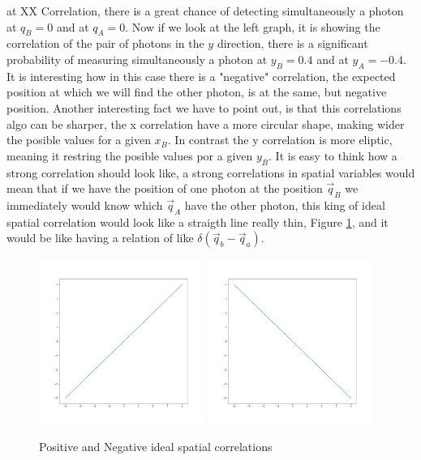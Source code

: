at XX Correlation, there is a great chance
of detecting simultaneously a photon at $q_B=0$ and at $q_A=0$. Now if we look at the left graph, it is showing the correlation 
of the pair of photons in the $y$ direction, there is a significant probability of measuring simultaneously a photon at $y_B=0.4$ 
and at $y_A=-0.4$. It is interesting how in this case there is a "negative" correlation, the expected position at which we will find the other photon, is at the same, but negative position.
Another interesting fact we have to point out, is that this correlations algo can be sharper, the x correlation have a more circular shape, making wider the posible values for a given $x_B$. In contrast the y correlation is more eliptic, meaning it restring the posible values por a given $y_B$.
It is easy to think how a strong correlation should look like, a strong correlations in spatial variables would mean that if we have the position of one photon at the position 
$\vec{q}_B$ we immediately would know which $\vec{q}_A$ have the other photon, this king of ideal spatial correlation would look like a straigth line
really thin, Figure \ref{fig:idealCorre}, and it would be like having a relation of like $\delta (\vec{q}_b -\vec{q}_a)$. 


\begin{figure}[h!]
\centering
{  \includegraphics[width=0.48\textwidth]{Figures/idealPositiveCorrelation.png} }
{  \includegraphics[width=0.48\textwidth]{Figures/idealNegativeCorrelation.png} }
\caption{Positive and Negative ideal spatial correlations}
 \label{fig:idealCorre}
\end{figure}


